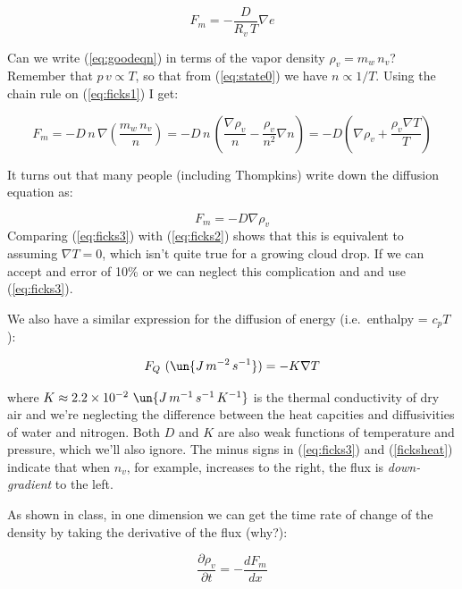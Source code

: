 \documentclass[12pt]{article}
\begin{document}
\begin{equation}
  \label{eq:goodeqn}
  F_m = -\frac{D}{R_v\,T} \nabla e
\end{equation}

Can we write (\ref{eq:goodeqn}) in terms of the vapor density 
$\rho_v = m_w\,n_v$?
Remember that $p\,v \propto T$, so that from (\ref{eq:state0})
we have $n \propto 1/T$.  Using the chain rule on (\ref{eq:ficks1})
I get:

\begin{equation}
  \label{eq:ficks2}
  F_m = -D\,n\, \nabla \left (\frac{m_w\,n_v}{n} \right ) =
 -D\,n\,\left ( \frac{\nabla \rho_v}{n} - \frac{\rho_v}{n^2} \nabla n \right )
= -D \left ( \nabla \rho_v + \frac{\rho_v \nabla T}{T} \right )
\end{equation}

It turns out that many people (including Thompkins) write down the diffusion
equation as:

\begin{equation}
  \label{eq:ficks3}
  F_m  = -D  \nabla \rho_v 
\end{equation}
Comparing (\ref{eq:ficks3}) with (\ref{eq:ficks2}) shows that
this is equivalent to assuming $\nabla T=0$, which isn't
quite true for a growing cloud drop.  If we can accept and error of 10\% or 
we can neglect this complication and 
and use (\ref{eq:ficks3}).


We also have a similar expression for the diffusion of energy
(i.e.~enthalpy = $c_p T$):

\begin{equation}
  \label{ficksheat}
  F_Q~(\un{J\,m^{-2}\,s^{-1}})= -K \nabla T
\end{equation}

\noindent 
where $K \approx 2.2 \times 10^{-2}~\un{J\,m^{-1}\,s^{-1}\,K^{-1}}$ is
the thermal conductivity of dry air and we're neglecting the
difference between the heat capcities and diffusivities of water and
nitrogen.  Both $D$ and $K$ are also weak functions of temperature and
pressure, which we'll also ignore.  The minus signs in
(\ref{eq:ficks3}) and (\ref{ficksheat}) indicate that when $n_v$, for
example, increases to the right, the flux is \emph{down-gradient} to
the left.

As shown in class, in one dimension we can get the time rate of change of the
density by taking the derivative of the flux (why?):

\begin{equation}
  \label{old}
  \frac{\partial \rho_v}{\partial t} = - \frac{ dF_m}{dx}
\end{equation}
\end{document}
